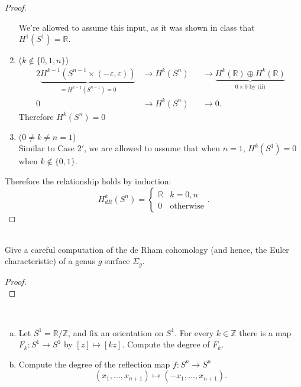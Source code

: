 \documentclass{article}
\newenvironment{problem}[2][Problem]{\begin{trivlist}
\item[\hskip \labelsep {\bfseries #1}\hskip \labelsep {\bfseries #2.}]}{\end{trivlist}}
\begin{document}
\begin{proof}
\begin{enumerate}
        We're allowed to assume this input, as it was shown in class that
        $H^1(S^1) = \mathbb{R}$.
      \item[Case 3.] ($k \not\in \{ 0, 1, n \}$)
      \begin{alignat*}{2}
        \underbrace{H^{k-1}(S^{n-1} \times (-\varepsilon, \varepsilon))}_{= H^{k-1}(S^{n-1}) = 0}
        &\rightarrow H^k(S^n)
        &&\rightarrow \underbrace{H^k(\mathbb{R}) \oplus H^k(\mathbb{R})}_{0 \times 0 \text{ by (ii)}}
        \\
        0 &\rightarrow H^k(S^n) &&\rightarrow 0.
      \end{alignat*} Therefore $H^k(S^n) = 0$
      \item[Case 3$'$.] ($0 \neq k \neq n = 1$)\\
        Similar to Case 2$'$, we are allowed to assume that when $n = 1$,
        $H^k(S^1) = 0$ when $k \not\in \{ 0, 1 \}$.
    \end{enumerate}
    Therefore the relationship holds by induction: \[
      H_{dR}^k(S^n) = \begin{cases}
        \mathbb{R} & k = 0,n \\
        0 & \text{otherwise}
      \end{cases}.
    \]
\end{proof}
\pagebreak

\begin{problem}{5} \text{} \\
  Give a careful computation of the de Rham cohomology (and hence, the Euler
  characteristic) of a genus $g$ surface $\Sigma_g$.
\end{problem}

\begin{proof} \text{} \\
\end{proof}
\pagebreak

\begin{problem}{6} \text{} \\
  \begin{enumerate}[(a)]
    \item Let $S^1 = \mathbb{R}/\mathbb{Z}$, and fix an orientation on $S^1$. For every
    $k \in \mathbb{Z}$ there is a map $F_k\colon S^1 \rightarrow S^1$ by
    $[z] \mapsto [kz]$. Compute the degree of $F_k$.
    \item Compute the degree of the reflection map $f\colon S^n \rightarrow S^n$ \[
      (x_1, \hdots, x_{n+1}) \mapsto (-x_1, \hdots, x_{n+1}).
    \]
  \end{enumerate}
\end{problem}
\end{document}
